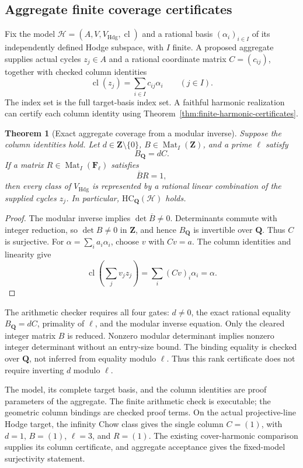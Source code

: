 \documentclass[11pt]{article}
\newtheorem{theorem}{Theorem}[section]
\theoremstyle{definition}
\theoremstyle{remark}
\newcommand{\Q}{\mathbf Q}
\begin{document}
\subsection{Aggregate finite coverage certificates}
\label{subsec:finite-coverage-certificate}

Fix the model \(\mathscr H=(A,V,V_{\mathrm{Hdg}},\operatorname{cl})\)
and a rational basis \((\alpha_i)_{i\in I}\) of its independently defined
Hodge subspace, with \(I\) finite. A proposed aggregate supplies actual
cycles \(z_j\in A\) and a rational coordinate matrix \(C=(c_{ij})\),
together with checked column identities
\[
 \operatorname{cl}(z_j)=\sum_{i\in I}c_{ij}\alpha_i
 \qquad(j\in I).
\]
The index set is the full target-basis index set. A faithful harmonic
realization can certify each column identity using
Theorem~\ref{thm:finite-harmonic-certificates}.

\begin{theorem}[Exact aggregate coverage from a modular inverse]
\label{thm:aggregate-finite-coverage}
Suppose the column identities hold. Let \(d\in\mathbf Z\setminus\{0\}\),
\(B\in\operatorname{Mat}_{I}(\mathbf Z)\), and a prime \(\ell\) satisfy
\[
 B_{\Q}=dC.
\]
If a matrix \(R\in\operatorname{Mat}_{I}(\mathbf F_\ell)\) satisfies
\[
 \overline B R=1,
\]
then every class of \(V_{\mathrm{Hdg}}\) is represented by a rational
linear combination of the supplied cycles \(z_j\). In particular,
\(\mathrm{HC}_{\Q}(\mathscr H)\) holds.
\end{theorem}
\begin{proof}
The modular inverse implies \(\det\overline B\ne0\). Determinants commute
with integer reduction, so \(\det B\ne0\) in \(\mathbf Z\), and hence
\(B_{\Q}\) is invertible over \(\Q\). Thus \(C\) is surjective. For
\(\alpha=\sum_i a_i\alpha_i\), choose \(v\) with \(Cv=a\). The column
identities and linearity give
\[
 \operatorname{cl}\left(\sum_j v_j z_j\right)
   =\sum_i(Cv)_i\alpha_i=\alpha.
\]
\end{proof}

The arithmetic checker requires all four gates: \(d\ne0\), the exact
rational equality \(B_{\Q}=dC\), primality of \(\ell\), and the modular
inverse equation. Only the cleared integer matrix \(B\) is reduced.
Nonzero modular determinant implies nonzero integer determinant without an
entry-size bound. The binding equality is checked over \(\Q\), not inferred
from equality modulo \(\ell\). Thus this rank certificate does not require
inverting \(d\) modulo \(\ell\).

The model, its complete target basis, and the column identities are proof
parameters of the aggregate. The finite arithmetic check is executable;
the geometric column bindings are checked proof terms. On the actual
projective-line Hodge target, the infinity Chow class gives the single
column \(C=(1)\), with \(d=1\), \(B=(1)\), \(\ell=3\), and \(R=(1)\).
The existing cover-harmonic comparison supplies its column certificate,
and aggregate acceptance gives the fixed-model surjectivity statement.
\end{document}
